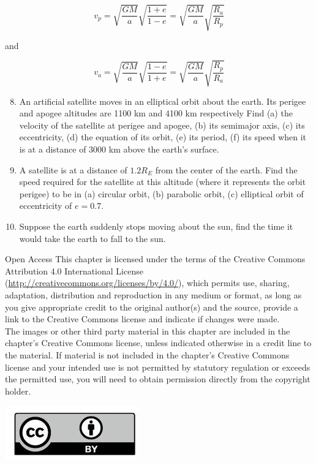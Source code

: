 \documentclass[10pt]{article}
\begin{document}
$$
v_{p}=\sqrt{\frac{G M}{a}} \sqrt{\frac{1+e}{1-e}}=\sqrt{\frac{G M}{a}} \sqrt{\frac{R_{a}}{R_{p}}}
$$

and

$$
v_{a}=\sqrt{\frac{G M}{a}} \sqrt{\frac{1-e}{1+e}}=\sqrt{\frac{G M}{a}} \sqrt{\frac{R_{p}}{R_{a}}}
$$

\begin{enumerate}
  \setcounter{enumi}{7}
  \item An artificial satellite moves in an elliptical orbit about the earth. Its perigee and apogee altitudes are 1100 km and 4100 km respectively Find (a) the velocity of the satellite at perigee and apogee, (b) its semimajor axis, (c) its eccentricity, (d) the equation of its orbit, (e) its period, (f) its speed when it is at a distance of 3000 km above the earth's surface.
  \item A satellite is at a distance of $1.2 R_{E}$ from the center of the earth. Find the speed required for the satellite at this altitude (where it represents the orbit perigee) to be in (a) circular orbit, (b) parabolic orbit, (c) elliptical orbit of eccentricity of $e=0.7$.
  \item Suppose the earth suddenly stops moving about the sun, find the time it would take the earth to fall to the sun.
\end{enumerate}

Open Access This chapter is licensed under the terms of the Creative Commons Attribution 4.0 International License (\href{http://creativecommons.org/licenses/by/4.0/}{http://creativecommons.org/licenses/by/4.0/}), which permits use, sharing, adaptation, distribution and reproduction in any medium or format, as long as you give appropriate credit to the original author(s) and the source, provide a link to the Creative Commons license and indicate if changes were made.\\
The images or other third party material in this chapter are included in the chapter's Creative Commons license, unless indicated otherwise in a credit line to the material. If material is not included in the chapter's Creative Commons license and your intended use is not permitted by statutory regulation or exceeds the permitted use, you will need to obtain permission directly from the copyright holder.

\begin{center}
\includegraphics[max width=\textwidth]{2024_09_13_db1f357d2aad0a03eb2eg-161}
\end{center}
\end{document}
